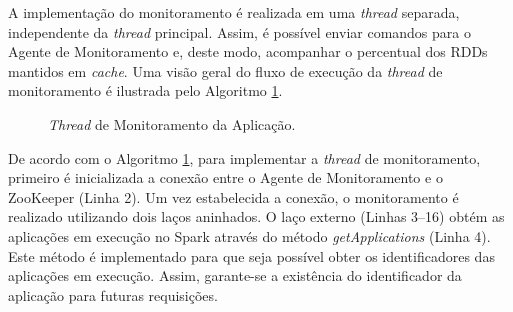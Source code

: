 A implementação do monitoramento é realizada em uma \textit{thread} separada, independente da \textit{thread} principal. Assim, é possível enviar comandos para o Agente de Monitoramento e, deste modo, acompanhar o percentual dos RDDs mantidos em \textit{cache}. Uma visão geral do fluxo de execução da \textit{thread} de  monitoramento é ilustrada pelo Algoritmo \ref{fig:thread-monitor}.


\begin{figure}[!ht] 
    \begin{algorithm}[H]
    \caption{\textit{Thread} de Monitoramento da Aplicação.}
        \label{fig:thread-monitor}
    \end{algorithm}
\end{figure}

De acordo com o Algoritmo \ref{fig:thread-monitor}, para implementar a \textit{thread} de monitoramento, primeiro é inicializada a conexão entre o Agente de Monitoramento e o ZooKeeper (Linha 2). Um vez estabelecida a conexão, o monitoramento é realizado utilizando dois laços aninhados. O laço externo (Linhas 3--16) obtém as aplicações em execução no Spark através do método \textit{getApplications} (Linha 4). Este método é implementado para que seja possível obter os identificadores das aplicações em execução. Assim, garante-se a existência do identificador da aplicação para futuras requisições.

